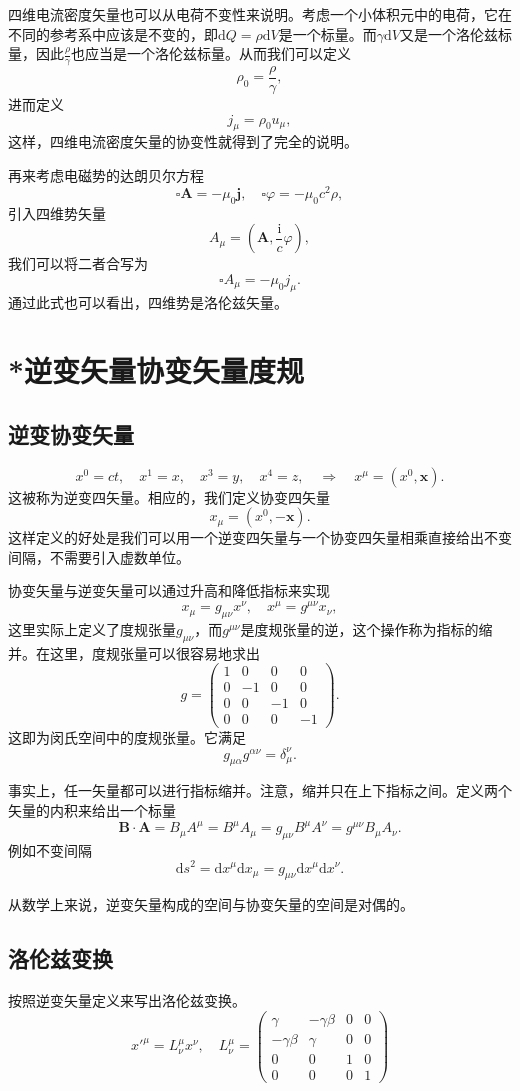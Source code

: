 \documentclass[UTF8]{ctexbook}
\renewcommand{\d}{\mathrm{d}}
\renewcommand{\b}{\boldsymbol}
\renewcommand{\i}{\mathrm{i}}
\numberwithin{equation}{chapter}
\begin{document}
	四维电流密度矢量也可以从电荷不变性来说明。考虑一个小体积元中的电荷，它在不同的参考系中应该是不变的，即$\d Q=\rho\d V$是一个标量。而$\gamma\d V$又是一个洛伦兹标量，因此$\frac{\rho}{\gamma}$也应当是一个洛伦兹标量。从而我们可以定义
	\[\rho_0=\frac{\rho}{\gamma},\]
	进而定义
	\[j_\mu=\rho_0u_\mu,\]
	这样，四维电流密度矢量的协变性就得到了完全的说明。
	
	再来考虑电磁势的达朗贝尔方程
	\[\square \b{A}=-\mu_0\b{j},\quad \square \varphi= -\mu_0c^2\rho,\]
	引入四维势矢量
	\[A_\mu=\left(\b{A},\frac{\i}{c}\varphi\right),\]
	我们可以将二者合写为
	\[\square A_\mu=-\mu_0 j_\mu.\]
	通过此式也可以看出，四维势是洛伦兹矢量。
	
	\section{*逆变矢量\quad 协变矢量\quad 度规}
	
	\subsection{逆变\quad 协变矢量}
	\[x^0=ct,\quad x^1=x,\quad x^3=y,\quad x^4=z,\quad \Rightarrow \quad  x^\mu=(x^0,\b{x}). \]
	这被称为逆变四矢量。相应的，我们定义协变四矢量
	\[x_\mu=(x^0,-\b{x}).\]
	这样定义的好处是我们可以用一个逆变四矢量与一个协变四矢量相乘直接给出不变间隔，不需要引入虚数单位。
	
	协变矢量与逆变矢量可以通过升高和降低指标来实现
	\[x_\mu=g_{\mu\nu}x^\nu,\quad x^\mu=g^{\mu\nu}x_\nu,\]
	这里实际上定义了度规张量$g_{\mu\nu}$，而$g^{\mu\nu}$是度规张量的逆，这个操作称为指标的缩并。在这里，度规张量可以很容易地求出
	\[g=\begin{pmatrix} 1 & 0 & 0 & 0 \\ 0 & -1 & 0 & 0 \\ 0 & 0 & -1 & 0 \\ 0 & 0 & 0 & -1 \end{pmatrix}.\]
	这即为闵氏空间中的度规张量。它满足
	\[g_{\mu\alpha}g^{\alpha \nu}=\delta_\mu^\nu.\]
	
	事实上，任一矢量都可以进行指标缩并。注意，缩并只在上下指标之间。定义两个矢量的内积来给出一个标量
	\[\b{B}\cdot\b{A}=B_\mu A^\mu=B^\mu A_\mu=g_{\mu\nu}B^\mu A^\nu = g^{\mu\nu}B_\mu A_\nu.\]
	例如不变间隔
	\[\d s^2=\d x^\mu\d x_\mu=g_{\mu\nu}\d x^\mu\d x^\nu.\]
	
	从数学上来说，逆变矢量构成的空间与协变矢量的空间是对偶的。
	
	\subsection{洛伦兹变换}
	按照逆变矢量定义来写出洛伦兹变换。
	\[x'^\mu=L_\nu^\mu x^\nu,\quad L_\nu^\mu=\begin{pmatrix}
		\gamma & -\gamma\beta & 0 & 0 \\ 
		-\gamma\beta & \gamma & 0 & 0 \\ 
		0 & 0 & 1 & 0 \\
		0 & 0 & 0 & 1 
	\end{pmatrix}\]
	
\end{document}
